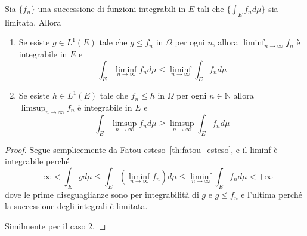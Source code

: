 \begin{lemmao}\label{thm:fatou}
    Sia \(\{f_{n}\} \) una successione di funzioni integrabili in \(E\) tali che
    \(\{\int_E f_{n} d\mu\} \) sia limitata. Allora
\begin{enumerate}[label = \arabic*.]
    \item Se esiste \(g \in L^{1}{(E)}\) tale che \(g \le f_{n}\) in \(\Omega\)
        per ogni \(n\), allora \(\liminf_{n \to \infty} f_{n}\) è integrabile in
        \(E\) e
        \[
            \int_E \liminf_{n \to \infty} f_{n} d\mu \le \liminf_{n \to \infty}
            \int_E f_{n} d\mu
        \]
    \item Se esiste \(h \in L^{1}{(E)}\) tale che \(f_{n} \le h\) in \(\Omega\)
        per ogni \(n \in \mathbb{N}\) allora \(\limsup_{n \to \infty} f_{n}\) è
        integrabile in \(E\) e
        \[
            \int_E \limsup_{n \to \infty} f_{n} d\mu \ge \limsup_{n \to \infty}
            \int_E f_{n} d\mu
        \]
\end{enumerate}
\end{lemmao}
\begin{proof}
    Segue semplicemente da Fatou esteso~\ref{th:fatou_esteso}, e il liminf è
    integrabile perché 
    \[
        -\infty < \int_E g d\mu \le \int_E{\left( \liminf_{n \to \infty} f_{n}
        \right)} d\mu \le \liminf_{n \to \infty} \int_E f_{n} d\mu < +\infty
    \]
    dove le prime diseguaglianze sono per integrabilità di \(g\) e \(g
    \le f_{n}\) e l'ultima perché la successione degli integrali è limitata.

    Similmente per il caso 2.
\end{proof}

